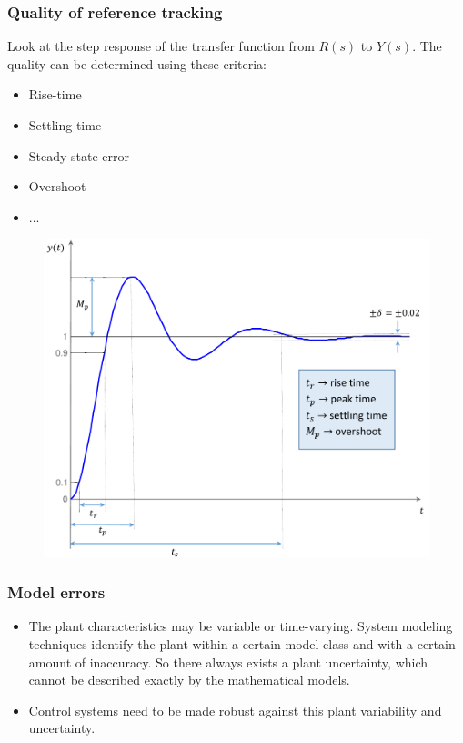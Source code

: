 \begin{frame}
	\frametitle{Quality of reference tracking}
	\begin{minipage}{0.4\linewidth}
		\begin{block}{}
		{\small	Look at the step response of the transfer function from $R(s)$ to $Y(s)$. The quality can be determined using these criteria:
			\begin{itemize}
				\item Rise-time
				\item Settling time
				\item Steady-state error
				\item Overshoot
				\item ...
			\end{itemize}}
		\end{block}
	\end{minipage}
	\hfill
	\begin{minipage}{0.5\linewidth}
		\begin{figure}
			\centering
			\includegraphics[width=1.1\linewidth]{tr_second_order_systems}
			\label{fig:properties}
		\end{figure}
	\end{minipage}
\end{frame}

\begin{frame}
	\frametitle{Model errors}
	\begin{block}{}
		\begin{itemize}
			\item The plant characteristics may be variable or time-varying.
			System modeling techniques identify the plant
			within a certain model class and with a certain amount
			of inaccuracy. So there always exists a plant uncertainty,
			which cannot be described exactly by the mathematical
			models.	
			\item Control systems need to be made robust against this
			plant variability and uncertainty.
		\end{itemize}
	\end{block}
\end{frame}


